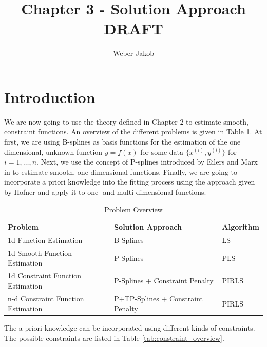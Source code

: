\documentclass[10pt,a4paper]{article}
\title{Chapter 3 - Solution Approach DRAFT}
\author{Weber Jakob}
\begin{document}
	\maketitle
	
	\tableofcontents
	\section{Introduction}
	
	We are now going to use the theory defined in Chapter 2 to estimate smooth, constraint functions. An overview of the different problems is given in Table \ref{tab:problem_overview}. At first, we are using B-splines as basis functions for the estimation of the one dimensional, unknown function $y = f(x)$ for some data $\{x^{(i)}, y^{(i)}\}$ for $i = 1, \dots, n$.  Next, we use the concept of P-splines introduced by Eilers and Marx in \cite{eilers1996flexible} to estimate smooth, one dimensional functions. Finally, we are going to incorporate a priori knowledge into the fitting process using the approach given by Hofner and apply it to one- and multi-dimensional functions. \cite{hofner2011monotonicity} 

	\begin{table}[h]
	\centering
	\begin{tabular}{|lll|}
		\hline
		\textbf{Problem}                   & \textbf{Solution Approach}           & \textbf{Algorithm}  \\ \hline \toprule
		1d Function Estimation             & B-Splines                            & LS                  \\ \hline
		1d Smooth Function Estimation      & P-Splines                            & PLS                 \\ \hline
		1d Constraint Function Estimation  & P-Splines + Constraint Penalty       & PIRLS 			    \\ \hline 
		n-d Constraint Function Estimation & P+TP-Splines + Constraint Penalty & PIRLS 			    \\ \hline \bottomrule
	\end{tabular}
	\caption{Problem Overview}
	\label{tab:problem_overview}
	\end{table}

	The a priori knowledge can be incorporated using different kinds of constraints. The possible constraints are listed in Table \ref{tab:constraint_overview}.
	
\end{document}
